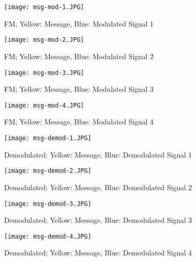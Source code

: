 \begin{figure}[H]
    \centering
    \begin{minipage}{0.45\linewidth}
        \centering
        \texttt{[image: msg-mod-1.JPG]}
        \caption{FM; Yellow: Message, Blue: Modulated Signal 1}
        \label{fig:fm1}
    \end{minipage}
    \hfill
    \begin{minipage}{0.45\linewidth}
        \centering
        \texttt{[image: msg-mod-2.JPG]}
        \caption{FM; Yellow: Message, Blue: Modulated Signal 2}
        \label{fig:fm2}
    \end{minipage}
    \vspace{1em}
    \begin{minipage}{0.45\linewidth}
        \centering
        \texttt{[image: msg-mod-3.JPG]}
        \caption{FM; Yellow: Message, Blue: Modulated Signal 3}
        \label{fig:fm3}
    \end{minipage}
    \hfill
    \begin{minipage}{0.45\linewidth}
        \centering
        \texttt{[image: msg-mod-4.JPG]}
        \caption{FM; Yellow: Message, Blue: Modulated Signal 4}
        \label{fig:fm4}
    \end{minipage}
\end{figure}

\pagebreak

\begin{figure}[H]
    \centering
    \begin{minipage}{0.45\linewidth}
        \centering
        \texttt{[image: msg-demod-1.JPG]}
        \caption{Demodulated; Yellow: Message, Blue: Demodulated Signal 1}
        \label{fig:demod1}
    \end{minipage}
    \hfill
    \begin{minipage}{0.45\linewidth}
        \centering
        \texttt{[image: msg-demod-2.JPG]}
        \caption{Demodulated; Yellow: Message, Blue: Demodulated Signal 2}
        \label{fig:demod2}
    \end{minipage}
    \vspace{1em}
    \begin{minipage}{0.45\linewidth}
        \centering
        \texttt{[image: msg-demod-3.JPG]}
        \caption{Demodulated; Yellow: Message, Blue: Demodulated Signal 3}
        \label{fig:demod3}
    \end{minipage}
    \hfill
    \begin{minipage}{0.45\linewidth}
        \centering
        \texttt{[image: msg-demod-4.JPG]}
        \caption{Demodulated; Yellow: Message, Blue: Demodulated Signal 4}
        \label{fig:demod4}
    \end{minipage}
\end{figure}
